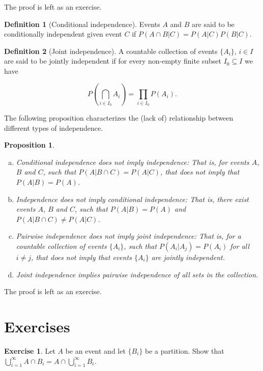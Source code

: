 \documentclass{book}
\theoremstyle{plain}%
\newtheorem{proposition}{Proposition}[section]
\theoremstyle{definition}
\newtheorem{definition}{Definition}[section]
\newtheorem{exercise}{Exercise}[chapter]
\begin{document}
The proof is left as an exercise.

\begin{definition}[Conditional independence]
Events $A$ and $B$ are said to be conditionally independent given event $C$ if $P(A \cap B|C) = P(A|C)P(B|C)$.
\end{definition}

\begin{definition}[Joint independence]
A countable collection of events $\{A_i\}$, $i \in I$ are said to be jointly independent if for every non-empty finite subset $I_0 \subseteq I$ we have 

$$\displaystyle P(\bigcap_{i \in I_0} A_i) = \prod_{i \in I_0} P(A_i).$$
\end{definition}

The following proposition characterizes the (lack of) relationship between different types of independence.

\begin{proposition}
\text{ }
\vspace{0.0cm}
\begin{enumerate}[(a)]
\item \emph{Conditional independence does not imply independence}: That is, for events $A$, $B$ and $C$, such that $P(A|B \cap C) = P(A|C)$, that does not imply that $P(A|B) = P(A)$.
\item \emph{Independence does not imply conditional independence}: That is, there exist events $A$, $B$ and $C$, such that $P(A|B) = P(A)$ and $P(A|B \cap C) \neq P(A|C)$.
\item \emph{Pairwise independence does not imply joint independence}: That is, for a countable collection of events $\{A_i\}$, such that $P(A_i|A_j) = P(A_i)$ for all $i \neq j$, that does not imply that events $\{A_i\}$ are jointly independent.
\item \emph{Joint independence implies pairwise independence of all sets in the collection}.
\end{enumerate}\label{prop:independence}
\end{proposition}

The proof is left as an exercise.

\section*{Exercises}

\begin{exercise}
Let $A$ be an event and let $\{B_i\}$ be a partition. Show that
$\bigcup_{i=1}^\infty A \cap B_i = A \cap \bigcup_{i=1}^\infty B_i$.
\end{exercise}
\end{document}
